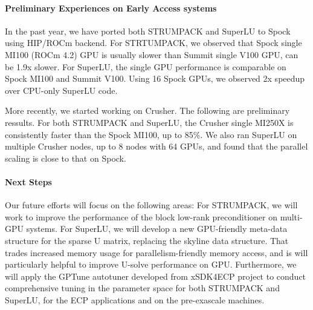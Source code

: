 \paragraph{Preliminary Experiences on Early Access systems}
In the past year, we have ported both STRUMPACK and SuperLU to Spock using
HIP/ROCm backend. For STRTUMPACK, we observed that Spock single MI100 (ROCm 4.2) GPU
is usually slower than Summit single V100 GPU, can be 1.9x slower. For SuperLU,
the single GPU performance is comparable on Spock MI100 and Summit V100.
Using 16 Spock GPUs, we observed 2x speedup over CPU-only SuperLU code.

More recently, we started working on Crusher. The following are preliminary
ressults. For both STRUMPACK and SuperLU, the Crusher single MI250X is consistently
faster than the Spock MI100, up to 85\%.
We also ran SuperLU on multiple Crusher nodes, up to 8 nodes with 64 GPUs, and
found that the parallel scaling is close to that on Spock.

\vspace{-.135in}
\paragraph{Next Steps} Our future efforts will focus on the following areas:
 For STRUMPACK, we will work to improve the performance of the block
 low-rank preconditioner on multi-GPU systems.
 For SuperLU, we will develop a new GPU-friendly meta-data structure for the sparse U matrix,
 replacing the skyline data structure. That trades increased memory usage for
 parallelism-friendly memory access, and is will particularly helpful to improve
 U-solve performance on GPU.
 Furthermore, we will apply the GPTune autotuner developed from xSDK4ECP project to conduct comprehensive
 tuning in the parameter space for both STRUMPACK and SuperLU, for the ECP applications and
 on the pre-exascale machines.


